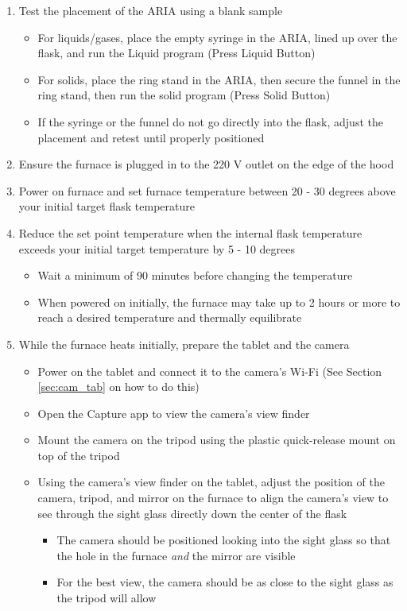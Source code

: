 \documentclass[letterpaper,11pt]{article}
\begin{document}
\begin{enumerate}
    \item Test the placement of the ARIA using a blank sample
         \begin{itemize}
         \item For liquids/gases, place the empty syringe in the ARIA, lined up 
            over the flask, and run the Liquid program (Press Liquid Button)
         \item For solids, place the ring stand in the ARIA, then secure the 
            funnel in the ring stand, then run the solid program (Press Solid 
			Button)
         \item If the syringe or the funnel do not go directly into the flask, 
            adjust the placement and retest until properly positioned
         \end{itemize}
    \item Ensure the furnace is plugged in to the 220 V outlet on the edge of 
        the hood %
    \item Power on furnace and set furnace temperature between 20 - 30 degrees 
        above your initial target flask temperature 
    \item Reduce the set point temperature when the internal flask temperature 
        exceeds your initial target temperature by 5 - 10 degrees 
        \begin{itemize}
        \item Wait a minimum of 90 minutes before changing the temperature
        \item When powered on initially, the furnace may take up to 2 hours or   
            more to reach a desired temperature and thermally equilibrate
        \end{itemize}
    
    \item While the furnace heats initially, prepare the tablet and the camera
        \begin{itemize}
        \item Power on the tablet and connect it to the camera's Wi-Fi (See 
            Section \ref{sec:cam_tab} on how to do this)
        \item Open the Capture app to view the camera's view finder
        \item Mount the camera on the tripod using the plastic quick-release
            mount on top of the tripod
        \item Using the camera's view finder on the tablet, adjust the
            position of the camera, tripod, and mirror on the furnace to 
            align the camera's view to see through the sight glass directly down
            the center of the flask
            \begin{itemize}
            \item The camera should be positioned looking into the sight glass
                so that the hole in the furnace \textit{and} the mirror 
                are visible 
            \item For the best view, the camera should be as close to the 
                sight glass as the tripod will allow
            \end{itemize}
        

\end{itemize}
\end{enumerate}
\end{document}
